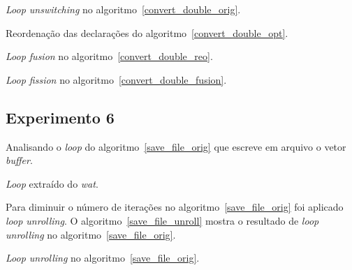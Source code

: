 \begin{algorithm}[H]
  \caption{\textit{Loop unswitching} no algoritmo~\ref{convert_double_orig}.}
\label{convert_double_opt}

\end{algorithm}

\begin{algorithm}[H]
  \caption{Reordenação das declarações do algoritmo~\ref{convert_double_opt}.}
\label{convert_double_reo}

\end{algorithm}

\begin{algorithm}[H]
  \caption{\textit{Loop fusion} no algoritmo~\ref{convert_double_reo}.}
\label{convert_double_fusion}

\end{algorithm}

\begin{algorithm}[H]
  \caption{\textit{Loop fission} no algoritmo~\ref{convert_double_fusion}.}
\label{convert_double_fission}

\end{algorithm}

\subsection{Experimento 6}

Analisando o \textit{loop} do algoritmo~\ref{save_file_orig} que escreve em arquivo o 
vetor \textit{buffer}.

\begin{algorithm}[H]
  \caption{\textit{Loop} extraído do \textit{wat}.}
\label{save_file_orig}

\end{algorithm}

Para diminuir o número de iterações no algoritmo~\ref{save_file_orig} foi
aplicado \textit{loop unrolling}. O algoritmo~\ref{save_file_unroll} mostra o
resultado de \textit{loop unrolling} no algoritmo~\ref{save_file_orig}.

\begin{algorithm}[H]
  \caption{\textit{Loop unrolling} no algoritmo~\ref{save_file_orig}.}
\label{save_file_unroll}

\end{algorithm}

